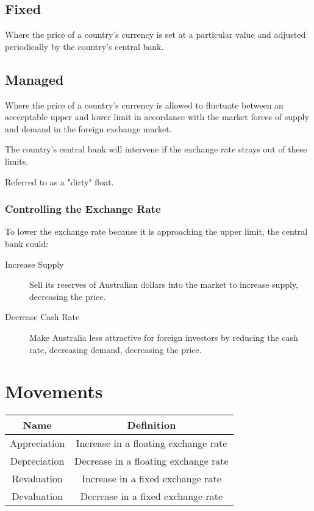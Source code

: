 \documentclass[a4paper,11pt]{article}
\begin{document}
\subsection{Fixed}

Where the price of a country's currency is set at a particular value and
adjusted periodically by the country's central bank.


\subsection{Managed}

Where the price of a country's currency is allowed to fluctuate between an
accceptable upper and lower limit in accordance with the market forces of
supply and demand in the foreign exchange market.

The country's central bank will intervene if the exchange rate strays out of
these limits.

Referred to as a "dirty" float.


\subsubsection{Controlling the Exchange Rate}

To lower the exchange rate because it is approaching the upper limit, the
central bank could:

\begin{description}
\item [Increase Supply] Sell its reserves of Australian dollars into the market
	to increase supply, decreasing the price.
\item [Decrease Cash Rate] Make Australia less attractive for foreign
	investors by reducing the cash rate, decreasing demand, decreasing the
	price.
\end{description}




\section{Movements}

\begin{center}
\begin{tabular}{c|c}
Name & Definition \\
\hline
Appreciation & Increase in a floating exchange rate \\
Depreciation & Decrease in a floating exchange rate \\
Revaluation & Increase in a fixed exchange rate \\
Devaluation & Decrease in a fixed exchange rate \\
\end{tabular}
\end{center}
\end{document}
